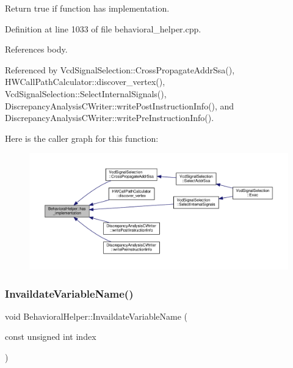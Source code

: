 Return true if function has implementation. 



Definition at line 1033 of file behavioral\+\_\+helper.\+cpp.



References body.



Referenced by Vcd\+Signal\+Selection\+::\+Cross\+Propagate\+Addr\+Ssa(), H\+W\+Call\+Path\+Calculator\+::discover\+\_\+vertex(), Vcd\+Signal\+Selection\+::\+Select\+Internal\+Signals(), Discrepancy\+Analysis\+C\+Writer\+::write\+Post\+Instruction\+Info(), and Discrepancy\+Analysis\+C\+Writer\+::write\+Pre\+Instruction\+Info().

Here is the caller graph for this function\+:
\nopagebreak
\begin{figure}[H]
\begin{center}
\leavevmode
\includegraphics[width=350pt]{dd/db2/classBehavioralHelper_a4b693bb37cb6ebe5af1d0e8b41ee847a_icgraph}
\end{center}
\end{figure}
\mbox{\label{classBehavioralHelper_ae1d9b8192e91994a5411a7022028b47c}} 
\subsubsection{\texorpdfstring{Invaildate\+Variable\+Name()}{InvaildateVariableName()}}
{\footnotesize\ttfamily void Behavioral\+Helper\+::\+Invaildate\+Variable\+Name (\begin{DoxyParamCaption}\item[{const unsigned int}]{index }\end{DoxyParamCaption})}



